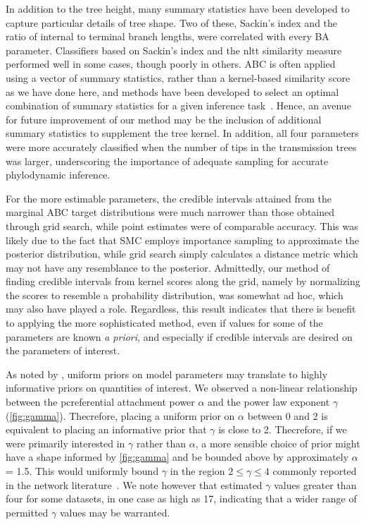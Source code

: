 In addition to the tree height, many summary statistics have been developed to
capture particular details of tree shape. Two of these, Sackin's index and the
ratio of internal to terminal branch lengths, were correlated with every
\gls{BA} parameter. Classifiers based on Sackin's index and the \gls{nltt}
similarity measure performed well in some cases, though poorly in others.
\gls{ABC} is often applied using a vector of summary statistics, rather than a
kernel-based similarity score as we have done here, and methods have been
developed to select an optimal combination of summary statistics for a given
inference task~\autocite{fearnhead2012constructing}. Hence, an avenue for
future improvement of our method may be the inclusion of additional summary
statistics to supplement the tree kernel. In addition, all four parameters were
more accurately classified when the number of tips in the transmission trees
was larger, underscoring the importance of adequate sampling for accurate
phylodynamic inference.

For the more estimable parameters, the credible intervals attained from the
marginal \gls{ABC} target distributions were much narrower than those obtained
through grid search, while point estimates were of comparable accuracy. This
was likely due to the fact that \gls{SMC} employs importance sampling to
approximate the posterior distribution, while grid search simply calculates a
distance metric which may not have any resemblance to the posterior.
Admittedly, our method of finding credible intervals from kernel scores along
the grid, namely by normalizing the scores to resemble a probability
distribution, was somewhat ad hoc, which may also have played a role.
Regardless, this result indicates that there is benefit to applying the more
sophisticated method, even if values for some of the parameters are known
\textit{a priori}, and especially if credible intervals are desired on the
parameters of interest.

As noted by \textcite{lintusaari2016identifiability}, uniform priors on model
parameters may translate to highly informative priors on quantities of
interest. We observed a non-linear relationship between the pcreferential
attachment power $\alpha$ and the power law exponent $\gamma$
(\cref{fig:gamma}). Thecrefore, placing a uniform prior on $\alpha$ between 0
and 2 is equivalent to placing an informative prior that $\gamma$ is close to
2. Thecrefore, if we were primarily interested in $\gamma$ rather than
$\alpha$, a more sensible choice of prior might have a shape informed by
\cref{fig:gamma} and be bounded above by approximately $\alpha$ = 1.5. This
would uniformly bound $\gamma$ in the region $2 \leq \gamma \leq 4$ commonly
reported in the network literature~\autocite{liljeros2001web,
schneeberger2004scale, colgate1989risk, brown2011transmission}. We note however
that \textcite{jones2003assessment} estimated $\gamma$ values greater than
four for some datasets, in one case as high as 17, indicating that a wider
range of permitted $\gamma$ values may be warranted.

